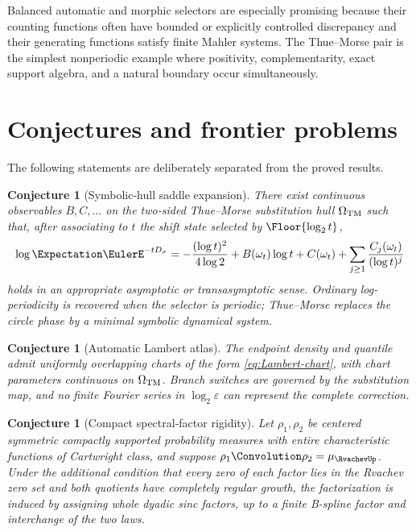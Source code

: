 \documentclass[11pt,oneside]{article}
\numberwithin{equation}{section}
\newtheorem{conjecture}[theorem]{Conjecture}
\theoremstyle{definition}
\theoremstyle{remark}
\newcommand{\eps}{\varepsilon}
\begin{document}
Balanced automatic and morphic selectors are especially promising because their counting
functions often have bounded or explicitly controlled discrepancy and their generating
functions satisfy finite Mahler systems.  The Thue--Morse pair is the simplest nonperiodic
example where positivity, complementarity, exact support algebra, and a natural boundary
occur simultaneously.

\section{Conjectures and frontier problems}
\label{sec:conjectures}

The following statements are deliberately separated from the proved results.

\begin{conjecture}[Symbolic-hull saddle expansion]
\label{conj:symbolic-saddle}
There exist continuous observables $B,C,\ldots$ on the two-sided Thue--Morse substitution
hull $\Omega_{\rm TM}$ such that, after associating to $t$ the shift state selected by
$\Floor{\log_2t}$,
\begin{equation}
 \log\Expectation\EulerE^{-tD_\sigma}
 =-\frac{(\log t)^2}{4\log2}
 +B(\omega_t)\log t+C(\omega_t)
 +\sum_{j\ge1}\frac{C_j(\omega_t)}{(\log t)^j}
 \label{eq:symbolic-saddle-conj}
\end{equation}
holds in an appropriate asymptotic or transasymptotic sense.  Ordinary log-periodicity is
recovered when the selector is periodic; Thue--Morse replaces the circle phase by a
minimal symbolic dynamical system.
\end{conjecture}

\begin{conjecture}[Automatic Lambert atlas]
\label{conj:Lambert-atlas}
The endpoint density and quantile admit uniformly overlapping charts of the form
\eqref{eq:Lambert-chart}, with chart parameters continuous on $\Omega_{\rm TM}$.  Branch
switches are governed by the substitution map, and no finite Fourier series in
$\log_2\eps$ can represent the complete correction.
\end{conjecture}

\begin{conjecture}[Compact spectral-factor rigidity]
\label{conj:rigidity}
Let $\rho_1,\rho_2$ be centered symmetric compactly supported probability measures with
entire characteristic functions of Cartwright class, and suppose
$\rho_1\Convolution\rho_2=\mu_{\RvachevUp}$.  Under the additional condition that every zero of each factor
lies in the Rvachev zero set and both quotients have completely regular growth, the
factorization is induced by assigning whole dyadic sinc factors, up to a finite
B-spline factor and interchange of the two laws.
\end{conjecture}
\end{document}

